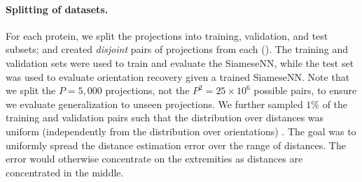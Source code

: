 \paragraph{Splitting of datasets.}
For each protein, we split the projections into training, validation, and test subsets; and created \textit{disjoint} pairs of projections from each ().
The training and validation sets were used to train and evaluate the SiameseNN, while the test set was used to evaluate orientation recovery given a trained SiameseNN.
Note that we split the $P=5,000$ projections, not the $P^2 = 25 \times 10^6$ possible pairs, to ensure we evaluate generalization to unseen projections.
We further sampled $1\%$ of the training and validation pairs such that the distribution over distances was uniform (independently from the distribution over orientations) .
The goal was to uniformly spread the distance estimation error over the range of distances.
The error would otherwise concentrate on the extremities as distances are concentrated in the middle.

